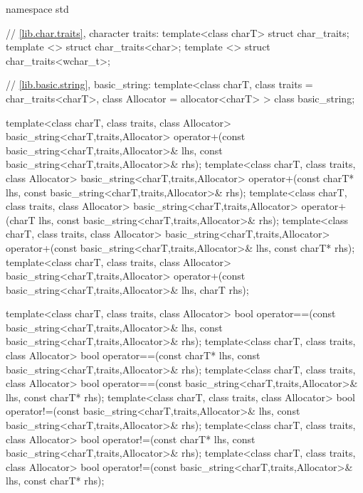 %
\begin{codeblock}
namespace std {
  // \ref{lib.char.traits}, character traits:
  template<class charT>
    struct char_traits;
  template <> struct char_traits<char>;
  template <> struct char_traits<wchar_t>;

  // \ref{lib.basic.string}, basic_string:
  template<class charT, class traits = char_traits<charT>,
           class Allocator = allocator<charT> >
    class basic_string;

  template<class charT, class traits, class Allocator>
    basic_string<charT,traits,Allocator>
      operator+(const basic_string<charT,traits,Allocator>& lhs,
                const basic_string<charT,traits,Allocator>& rhs);
  template<class charT, class traits, class Allocator>
    basic_string<charT,traits,Allocator>
      operator+(const charT* lhs,
                const basic_string<charT,traits,Allocator>& rhs);
  template<class charT, class traits, class Allocator>
    basic_string<charT,traits,Allocator>
      operator+(charT lhs, const basic_string<charT,traits,Allocator>& rhs);
  template<class charT, class traits, class Allocator>
    basic_string<charT,traits,Allocator>
      operator+(const basic_string<charT,traits,Allocator>& lhs,
                const charT* rhs);
  template<class charT, class traits, class Allocator>
    basic_string<charT,traits,Allocator>
      operator+(const basic_string<charT,traits,Allocator>& lhs, charT rhs);

  template<class charT, class traits, class Allocator>
    bool operator==(const basic_string<charT,traits,Allocator>& lhs,
                    const basic_string<charT,traits,Allocator>& rhs);
  template<class charT, class traits, class Allocator>
    bool operator==(const charT* lhs,
                    const basic_string<charT,traits,Allocator>& rhs);
  template<class charT, class traits, class Allocator>
    bool operator==(const basic_string<charT,traits,Allocator>& lhs,
                    const charT* rhs);
  template<class charT, class traits, class Allocator>
    bool operator!=(const basic_string<charT,traits,Allocator>& lhs,
                    const basic_string<charT,traits,Allocator>& rhs);
  template<class charT, class traits, class Allocator>
    bool operator!=(const charT* lhs,
                    const basic_string<charT,traits,Allocator>& rhs);
  template<class charT, class traits, class Allocator>
    bool operator!=(const basic_string<charT,traits,Allocator>& lhs,
                    const charT* rhs);

}
\end{codeblock}

